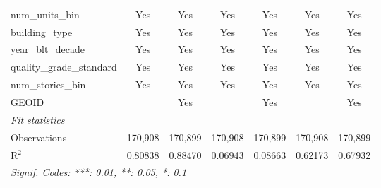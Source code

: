 \begin{tabular}{lcccccc}
   num\_units\_bin                                             & Yes             & Yes             & Yes             & Yes             & Yes             & Yes\\  
   building\_type                                              & Yes             & Yes             & Yes             & Yes             & Yes             & Yes\\  
   year\_blt\_decade                                           & Yes             & Yes             & Yes             & Yes             & Yes             & Yes\\  
   quality\_grade\_standard                                    & Yes             & Yes             & Yes             & Yes             & Yes             & Yes\\  
   num\_stories\_bin                                           & Yes             & Yes             & Yes             & Yes             & Yes             & Yes\\  
   GEOID                                                       &                 & Yes             &                 & Yes             &                 & Yes\\  
   \midrule
   \emph{Fit statistics}\\
   Observations                                                & 170,908         & 170,899         & 170,908         & 170,899         & 170,908         & 170,899\\  
   R$^2$                                                       & 0.80838         & 0.88470         & 0.06943         & 0.08663         & 0.62173         & 0.67932\\  
   \midrule \midrule
   \multicolumn{7}{l}{\emph{Signif. Codes: ***: 0.01, **: 0.05, *: 0.1}}\\
\end{tabular}
\par\endgroup

